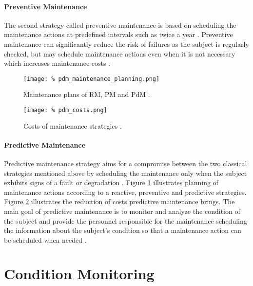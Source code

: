 \paragraph{Preventive Maintenance}
The second strategy called preventive maintenance is based on scheduling the maintenance actions at predefined intervals such as twice a year \cite{ran2019survey}.
Preventive maintenance can significantly reduce the risk of failures as the subject is regularly checked, but may schedule maintenance actions even when it is not necessary which increases maintenance costs \cite{ran2019survey}.

\begin{figure}
    \centering
    \texttt{[image: \%
        pdm\_maintenance\_planning.png]}
    \caption{Maintenance plans of RM, PM and PdM \cite{ran2019survey}.}
    \label{fig:pdm_maintenance_planning}
\end{figure}

\begin{figure}
    \centering
    \texttt{[image: \%
        pdm\_costs.png]}
    \caption{Costs of maintenance strategies \cite{sanger_2019}.}
    \label{fig:pdm_costs}
\end{figure}

\paragraph{Predictive Maintenance}
Predictive maintenance strategy aims for a compromise between the two classical strategies mentioned above by scheduling the maintenance only when the subject exhibits signs of a fault or degradation \cite{ran2019survey}.
Figure \ref{fig:pdm_maintenance_planning} illustrates planning of maintenance actions according to a reactive, preventive and predictive strategies. 
Figure \ref{fig:pdm_costs} illustrates the reduction of costs predictive maintenance brings.
The main goal of predictive maintenance is to monitor and analyze the condition of the subject and provide the personnel responsible for the maintenance scheduling the information about the subject's condition so that a maintenance action can be scheduled when needed \cite{mobley2002introduction, ran2019survey}.

\section{Condition Monitoring}
\label{sec:pdm_data}

